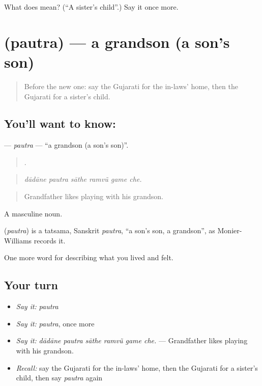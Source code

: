 \begin{tcolorbox}[breakable,colback=teal!4,colframe=teal!35!black,title={Before you move on}]
What does  mean? (\textquotedblleft{}A sister's child\textquotedblright{}.) Say it once more.
\end{tcolorbox}
\section[\texorpdfstring{\gu{પૌત્ર} (pautra)}{પૌત્ર (pautra)}]{ (pautra) — a grandson (a son's son)}

\label{lesson:GU-C492-pautra}



\begin{quote}
Before the new one: say the Gujarati for the in-laws' home, then the Gujarati for a sister's child.
\end{quote}

\subsection*{You'll want to know: }
\textbf{} — \emph{pautra} — \textquotedblleft{}a grandson (a son's son)\textquotedblright{}.

\begin{quote}
     .
\end{quote}

\begin{quote}
\emph{dādāne pautra sāthe ramvũ game che.}
\end{quote}

\begin{quote}
Grandfather likes playing with his grandson.
\end{quote}

A masculine noun.

\begin{cousinweb}
\textbf{} (\emph{pautra}) is a tatsama, Sanskrit \emph{pautra}, \textquotedblleft{}a son's son, a grandson\textquotedblright{}, as Monier-Williams records it.
\end{cousinweb}

\begin{grammarlens}[title={What you've built}]
One more word for describing what you lived and felt.
\end{grammarlens}

\subsection*{Your turn}
\begin{itemize}
\raggedright
  \item \emph{Say it:} \emph{pautra}
  \item \emph{Say it:} \emph{pautra}, once more
  \item \emph{Say it:} \emph{dādāne pautra sāthe ramvũ game che.} — Grandfather likes playing with his grandson.
  \item \emph{Recall:} say the Gujarati for the in-laws' home, then the Gujarati for a sister's child, then say \emph{pautra} again
\end{itemize}

